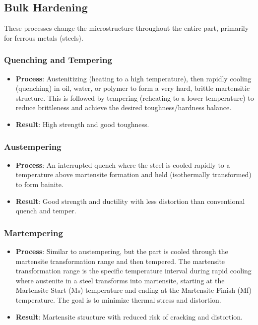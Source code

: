 \subsection{Bulk Hardening}
These processes change the microstructure throughout the entire part, primarily for ferrous metals (steels).
\subsubsection{Quenching and Tempering}
\begin{itemize}
  \item \textbf{Process}: Austenitizing (heating to a high temperature), then rapidly cooling (quenching) in oil, water, or polymer to form a very hard, brittle martensitic structure. This is followed by tempering (reheating to a lower temperature) to reduce brittleness and achieve the desired toughness/hardness balance.
  \item \textbf{Result}: High strength and good toughness.
\end{itemize}

\subsubsection{Austempering}
\begin{itemize}
  \item \textbf{Process}: An interrupted quench where the steel is cooled rapidly to a temperature above martensite formation and held (isothermally transformed) to form bainite.
  \item \textbf{Result}: Good strength and ductility with less distortion than conventional quench and temper.
\end{itemize}

\subsubsection{Martempering}
\begin{itemize}
  \item \textbf{Process}: Similar to austempering, but the part is cooled through the martensite transformation range and then tempered. The martensite transformation range is the specific temperature interval during rapid cooling where austenite in a steel transforms into martensite, starting at the Martensite Start (Ms) temperature and ending at the Martensite Finish (Mf) temperature. The goal is to minimize thermal stress and distortion.
  \item \textbf{Result}: Martensite structure with reduced risk of cracking and distortion.
\end{itemize}


